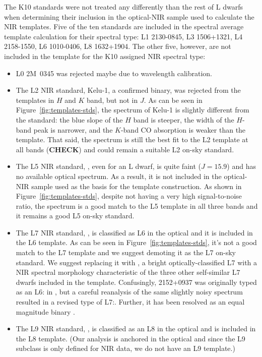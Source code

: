 \documentclass[12pt,preprint]{aastex}
\begin{document}
The K10 standards were not treated any differently than the rest of L dwarfs when determining their inclusion in the optical-NIR sample used to calculate the NIR templates. 
Five of the ten standards are included in the spectral average template calculation for their spectral type: L1 2130-0845, L3 1506+1321, L4 2158-1550, L6 1010-0406, L8 1632+1904.
The other five, however, are not included in the template for the K10 assigned NIR spectral type:
\begin{itemize}
	
	\item L0 2M~0345 was rejected maybe due to wavelength calibration.

	\item The L2 NIR standard,  Kelu-1, a confirmed binary, was rejected from the templates in $H$ and $K$ band, but not in $J$. As can be seen in Figure~\ref{fig:templates-stds}, the spectrum of Kelu-1 is slightly different from the standard: the blue slope of the $H$ band is steeper, the width of the $H$-band peak is narrower, and the $K$-band CO absorption is weaker than the template. That said, the spectrum is still the best fit to the L2 template at all bands (\textbf{CHECK}) and could remain a suitable L2 on-sky standard.

	\item The L5 NIR standard, , even for an L dwarf, is quite faint ($J=15.9$) and has no available optical spectrum. As a result, it is not included in the optical-NIR sample used as the basis for the template construction. As shown in Figure~\ref{fig:templates-stds}, despite not having a very high signal-to-noise ratio, the spectrum is a good match to the L5 template in all three bands and it remains a good L5 on-sky standard.

	\item The L7 NIR standard, , is classified as L6 in the optical \cite{K00} and it is included in the L6 template. As can be seen in Figure~\ref{fig:templates-stds}, it's not a good match to the L7 template and we suggest demoting it as the L7 on-sky standard. We suggest replacing it with , a bright optically-classified L7 with a NIR spectral morphology characteristic of the three other self-similar L7 dwarfs included in the template. Confusingly, 2152+0937 was originally typed as an L6: in \cite{Reid08}, but a careful reanalysis of the same slightly noisy spectrum resulted in a revised type of L7:. Further, it has been resolved as an equal magnitude binary \cite{Reid06_binary}.
		
	\item The L9 NIR standard, , is classified as an L8 in the optical and is included in the L8 template. (Our analysis is anchored in the optical and since the L9 subclass is only defined for NIR data, we do not have an L9 template.) 
	
\end{itemize}
\end{document}
